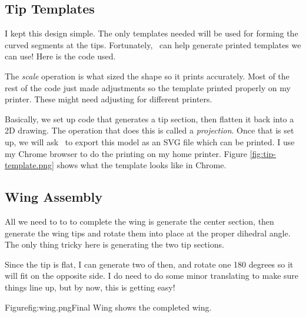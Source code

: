 
\subsection{Tip Templates}

I kept this design simple. The only templates needed will be used for forming
the curved segments at the tips. Fortunately, \osc\ can help generate
printed templates we can use! Here is the code used.


The {\it scale} operation is what sized the shape so it prints accurately. Most
of the rest of the code just made adjustments so the template printed properly
on my printer. These might need adjusting for different printers.

Basically, we set up code that generates a tip section, then flatten it back
into a 2D drawing. The operation that does this is called a {\it projection}.
Once that is set up, we will ask \osc\ to export this model as an SVG file
which can be printed. I use my Chrome browser to do the printing on my home
printer.  Figure \ref{fig:tip-template.png} shows what the template looks like
in Chrome.


\subsection{Wing Assembly}

All we need to to to complete the wing is generate the center section, then
generate the wing tips and rotate them into place at the proper dihedral angle.
The only thing tricky here is generating the two tip sections.

Since the tip is flat, I can generate two of then, and rotate one 180 degrees
so it will fit on the opposite side. I do need to do some minor translating to
make sure things line up, but by now, this is getting easy!

Figure{fig:wing.png}{Final Wing} shows the completed wing.

